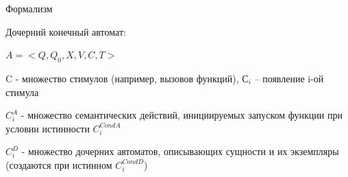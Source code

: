 \documentclass[12pt]{beamer}
\begin{document}
{
\begin{frame}[fragile]{Формализм}
  \begin{mybox}[]
  Дочерний конечный автомат:
  
	$A = <Q, Q_0, X, V, C, T>$
	
	C - множество стимулов (например, вызовов функций), $С_i$ – появление i-ой стимула
	
	$C_i^A$ - множество семантических действий, инициируемых запуском функции при условии истинности $C_i^{CondA}$
	
	$C_i^D$ - множество дочерних автоматов, описывающих сущности и их экземпляры (создаются при истинном $C_i^{CondD}$)
  \end{mybox}
\end{frame}
}
\end{document}
